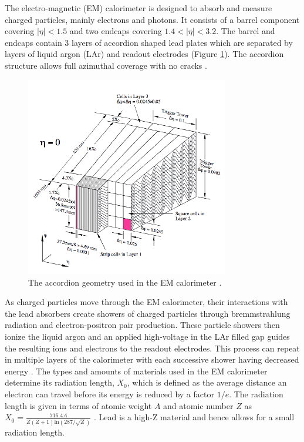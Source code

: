 The electro-magnetic (EM) calorimeter is designed to absorb and measure charged particles, mainly electrons and photons. It consists of a barrel component covering $|\eta|<1.5$ and two endcaps covering $1.4<|\eta|<3.2$. The barrel and endcaps contain 3 layers of accordion shaped lead plates which are separated by layers of liquid argon (LAr) and readout electrodes (Figure \ref{fig:em_calo}). The accordion structure allows full azimuthal coverage with no cracks \cite{em_calo_run2}.\\

\begin{figure}[htb!]
    \centering
    \includegraphics[width=3.5in]{figures/chapter2/em_calo.png}
    \caption{The accordion geometry used in the EM calorimeter \cite{em_calo_run2}.}
    \label{fig:em_calo}
\end{figure}

\pagebreak

As charged particles move through the EM calorimeter, their interactions with the lead absorbers create showers of charged particles through bremmstrahlung radiation and electron-positron pair production. These particle showers then ionize the liquid argon and an applied high-voltage in the LAr filled gap guides the resulting ions and electrons to the readout electrodes. This process can repeat in multiple layers of the calorimeter with each successive shower having decreased energy \cite{em_calo_run2}. The types and amounts of materials used in the EM calorimeter determine its radiation length, $X_0$, which is defined as the average distance an electron can travel before its energy is reduced by a factor $1/e$. The radiation length is given in terms of atomic weight $A$ and atomic number $Z$ as $X_0=\frac{716.4 A}{Z(Z+1)\text{ln}(287/\sqrt{Z})}$ \cite{pdg}. Lead is a high-Z material and hence allows for a small radiation length.\\

